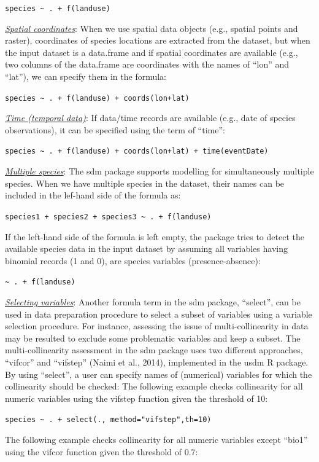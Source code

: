 \documentclass[
]{article}
\begin{document}
\begin{mdframed}[backgroundcolor=gray!10, linecolor=black!75, linewidth=2pt, roundcorner=5pt, shadow=true,frametitle={\textbf{BOX 1: \uline{Formula interface in the sdmData function}}}]
\texttt{species \textasciitilde{} . + f(landuse)}


\uline{\textit{Spatial coordinates}}: When we use spatial data objects (e.g., spatial points and raster), coordinates of species locations are extracted from the dataset, but when the input dataset is a data.frame and if spatial coordinates are available (e.g., two columns of the data.frame are coordinates with the names of “lon” and “lat”), we can specify them in the formula:

\texttt{species \textasciitilde{} . + f(landuse) + coords(lon+lat)}

\uline{\textit{Time (temporal data)}}: If data/time records are available (e.g., date of species observations), it can be specified using the term of “time”:

\texttt{species \textasciitilde{} . + f(landuse) + coords(lon+lat) + time(eventDate)}

\uline{\textit{Multiple species}}: The sdm package supports modelling for simultaneously multiple species. When we have multiple species in the dataset, their names can be included in the lef-hand side of the formula as:

\texttt{species1 + species2 + species3 \textasciitilde{} . + f(landuse)}

If the left-hand side of the formula is left empty, the package tries to detect the available species data in the input dataset by assuming all variables having binomial records (1 and 0), are species variables (presence-absence):

\texttt{\textasciitilde{} . + f(landuse)}


\uline{\textit{Selecting variables}}: Another formula term in the sdm package, “select”, can be used in data preparation procedure to select a subset of variables using a variable selection procedure. For instance, assessing the issue of multi-collinearity in data may be resulted to exclude some problematic variables and keep a subset. The multi-collinearity assessment in the sdm package uses two different approaches, “vifcor” and “vifstep” (Naimi et al., 2014), implemented in the usdm R package. By using “select”, a user can specify names of (numerical) variables for which the collinearity should be checked:
The following example checks collinearity for all numeric variables using the vifstep function given the threshold of 10:


\texttt{species \textasciitilde{} . + select(., method="vifstep",th=10) }

The following example checks collinearity for all numeric variables except “bio1” using the vifcor function given the threshold of 0.7:


\end{mdframed}
\end{document}
